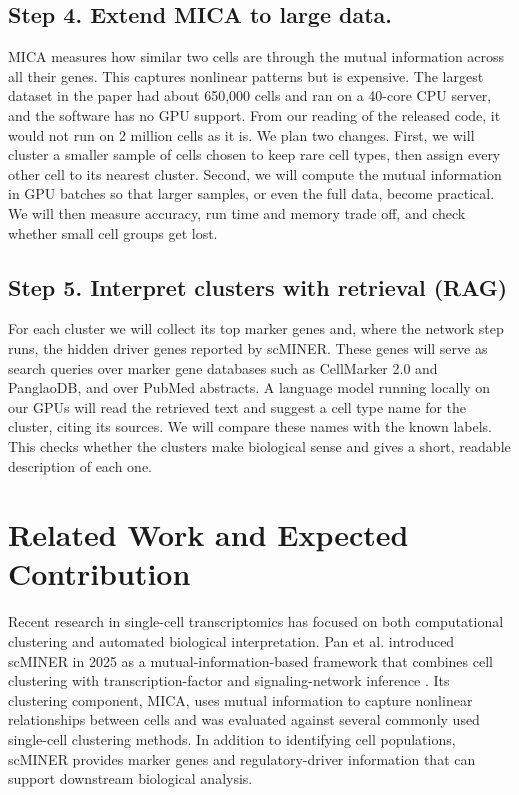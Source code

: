 \documentclass[conference]{IEEEtran}
\begin{document}
\subsection{Step 4. Extend MICA to large data.}
MICA measures how similar two cells are through the mutual information across all their genes. This captures nonlinear patterns but is expensive. The largest dataset in the paper had about 650,000 cells and ran on a 40-core CPU server, and the software has no GPU support. From our reading of the released code, it would not run on 2 million cells as it is. We plan two changes. First, we will cluster a smaller sample of cells chosen to keep rare cell types, then assign every other cell to its nearest cluster. Second, we will compute the mutual information in GPU batches so that larger samples, or even the full data, become practical. We will then measure accuracy, run time and memory trade off, and check whether small cell groups get lost.

\subsection{Step 5. Interpret clusters with retrieval (RAG)}
For each cluster we will collect its top marker genes and, where the network step runs, the hidden driver genes reported by scMINER. These genes will serve as search queries over marker gene databases such as CellMarker 2.0 and PanglaoDB, and over PubMed abstracts. A language model running locally on our GPUs will read the retrieved text and suggest a cell type name for the cluster, citing its sources. We will compare these names with the known labels. This checks whether the clusters make biological sense and gives a short, readable description of each one. 

\section{Related Work and Expected Contribution}
Recent research in single-cell transcriptomics has focused on both computational clustering and automated biological interpretation. Pan et al. introduced scMINER in 2025 as a mutual-information-based framework that combines cell clustering with transcription-factor and signaling-network inference \cite{pan2025scminer}. Its clustering component, MICA, uses mutual information to capture nonlinear relationships between cells and was evaluated against several commonly used single-cell clustering methods. In addition to identifying cell populations, scMINER provides marker genes and regulatory-driver information that can support downstream biological analysis.
\end{document}
